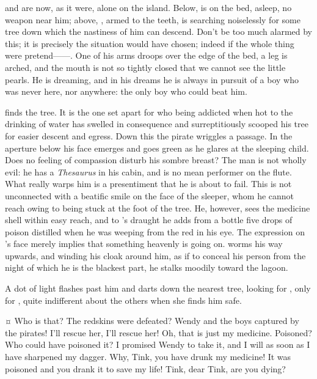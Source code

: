 \begin{drama}
{\hook and \peter are now, as it were, alone on the island.
Below, \peter is on the bed, asleep, no weapon near him;
above, \hook, armed to the teeth, is searching noiselessly for some tree down which the nastiness of him can descend.
Don’t be too much alarmed by this; it is precisely the situation \peter would have chosen;
indeed if the whole thing were pretend——.
One of his arms droops over the edge of the bed, a leg is arched,
and the mouth is not so tightly closed that we cannot see the little pearls.
He is dreaming, and in his dreams he is always in pursuit of a boy who was never here, nor anywhere:
the only boy who could beat him.

\hook finds the tree.
It is the one set apart for \slightly who being addicted when hot to the drinking of water has swelled in consequence
and surreptitiously scooped his tree for easier descent and egress.
Down this the pirate wriggles a passage.
In the aperture below his face emerges and goes green as he glares at the sleeping child.
Does no feeling of compassion disturb his sombre breast?
The man is not wholly evil: he has a \emph{Thesaurus} in his cabin, and is no mean performer on the flute.
What really warps him is a presentiment that he is about to fail.
This is not unconnected with a beatific smile on the face of the sleeper,
whom he cannot reach owing to being stuck at the foot of the tree.
He, however, sees the medicine shell within easy reach,
and to \wendy’s draught he adds from a bottle five drops of poison
distilled when he was weeping from the red in his eye.
The expression on \peter’s face merely implies that something heavenly is going on.
\hook worms his way upwards, and winding his cloak around him,
as if to conceal his person from the night of which he is the blackest part,
he stalks moodily toward the lagoon.

A dot of light flashes past him and darts down the nearest tree, looking for \peter, only for \peter,
quite indifferent about the others when she finds him safe.}

\peterspeaks {}¤
Who is that?
The redskins were defeated?
Wendy and the boys captured by the pirates!
I’ll rescue her, I’ll rescue her!
Oh, that is just my medicine.
Poisoned?
Who could have poisoned it?
I promised Wendy to take it, and I will as soon as I have sharpened my dagger.
Why, Tink, you have drunk my medicine!
It was poisoned and you drank it to save my life!
Tink, dear Tink, are you dying?


\end{drama}
